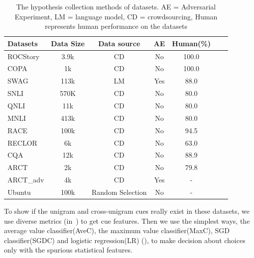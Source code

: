 \begin{table}[h]
\scriptsize
\centering
\begin{tabular}{p{7mm}cccccc}\hline
\textbf{Datasets} &Data Size & Data source& AE& Human(\%)\\ \hline                                   
ROCStory & 3.9k         & CD         &No    &100.0  \\
COPA        & 1k           &  CD           &No   &100.0     \\
SWAG       & 113k       &  LM            &Yes  & 88.0\\
SNLI          &  570K     & CD           &No     &80.0\\
QNLI         & 11k         &  CD            &No    &80.0\\
MNLI         & 413k       &  CD            & No   &80.0\\
RACE        & 100k      &  CD            &No    &94.5\\
RECLOR       &  6k          &  CD             &No   &63.0\\
CQA         & 12k        &  CD              &No    &88.9\\
ARCT         & 2k         & CD               &No    &79.8\\
ARCT\_adv& 4k         & CD                &Yes   & -\\
Ubuntu   & 100k      &Random Selection & No  & -  \\
\hline
\end{tabular}
\caption{\label{dataset_intro} The hypothesis collection methods of datasets.  
AE = Adversarial Experiment, LM = language model, CD = crowdsourcing, Human represents 
human performance on the datasets}
\end{table}
 
To  show if the unigram and cross-unigram cues really exist in these datasets, 
we use diverse metrics (in~) to get cue features. 
Then we use the simplest ways, the average value classifier(AveC), 
the maximum value classifier(MaxC), SGD classifier(SGDC) and 
logistic regression(LR) (), 
to make decision about choices only with the spurious statistical features. 

